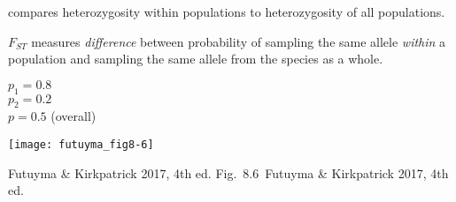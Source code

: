 \documentclass[t]{beamer}
\newcommand{\futuyma}[1]{%
	\ifthenelse{\isempty{#1}}%
	{Futuyma \& Kirkpatrick 2017, 4th ed.}%
	{Fig.~#1~Futuyma \& Kirkpatrick 2017, 4th ed.}%
}
\newcommand{\backskip}{\vspace{-0.5\baselineskip}}
\begin{document}
\begin{frame}{ compares heterozygosity within populations to heterozygosity of all populations.}

\backskip

\begin{multicols}{2}


\hangpara $F_{ST}$ measures \emph{difference} between probability of sampling the same allele \emph{within} a population and sampling the same allele from the species as a whole.

\vspace*{\baselineskip}
$p_1 = 0.8$ \\ 
$p_2 = 0.2$ \\
$p = 0.5$ (overall)


\columnbreak

\centering
\noindent\texttt{[image: futuyma\_fig8-6]}

\end{multicols}


\tinyfill \futuyma{8.6}
\end{frame}


\end{document}
